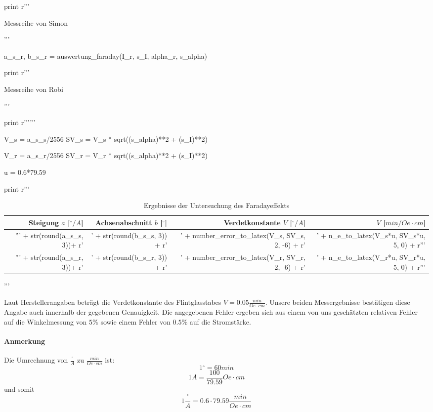\begin{python}
\begin{table}[H]
\begin{minipage}[b]{0.5\linewidth}
print r'''  \caption{Messreihe von Simon}
	  \end{minipage}
	  \begin{minipage}[b]{0.5\linewidth}
	    \centering
           '''

a_s_r, b_s_r = auswertung_faraday(I_r, s_I, alpha_r, s_alpha)

print r'''\caption{Messreihe von Robi}
	  \end{minipage}
          \end{table} '''




print r'''\faradayDesc'''

V_s = a_s_s/2556
SV_s = V_s * sqrt((s_alpha)**2 + (s_I)**2)

V_r = a_s_r/2556
SV_r = V_r * sqrt((s_alpha)**2 + (s_I)**2)

u = 0.6*79.59

print r'''
\begin{table}[H]
\begin{tabular}{rrrr}
 \toprule
 Steigung $a$ [${}^{\circ}/A$] & Achsenabschnitt $b$ [${}^{\circ}$] & Verdetkonstante $V$ [${}^{\circ}/A$] & $V$ [$min/Oe \cdot cm$] \\
 \midrule
''' + str(round(a_s_s, 3))+ r' & ' + str(round(b_s_s, 3)) + r' & ' + number_error_to_latex(V_s, SV_s, 2, -6) + r' & ' + n_e_to_latex(V_s*u, SV_s*u, 5, 0) + r'''\\
''' + str(round(a_s_r, 3))+ r' & ' + str(round(b_s_r, 3)) + r' & ' + number_error_to_latex(V_r, SV_r, 2, -6) + r' & ' + n_e_to_latex(V_r*u, SV_r*u, 5, 0) + r'''\\
 \bottomrule  
\end{tabular}
\caption{Ergebnisse der Untersuchung des Faradayeffekts}
\end{table}

'''

\end{python}

Laut Herstellerangaben beträgt die Verdetkonstante des Flintglasstabes $V = 0.05 \frac{min}{Oe \cdot cm}$. Unsere beiden Messergebnisse bestätigen diese Angabe auch innerhalb der gegebenen Genauigkeit. Die angegebenen Fehler ergeben sich aus einem von uns geschätzten relativen Fehler auf die Winkelmessung von $5\%$ sowie einem Fehler von $0.5\%$ auf die Stromstärke. 

\paragraph{Anmerkung}
Die Umrechnung von $\frac{{}^{\circ}}{A}$ zu $\frac{min}{Oe \cdot cm}$ ist:
$$ 1 {}^{\circ} = 60 min $$
$$ 1 A = \frac{100}{79.59}Oe \cdot cm $$
und somit
$$ 1 \frac{{}^{\circ}}{A} = 0.6 \cdot 79.59  \frac{min}{Oe \cdot cm} $$
